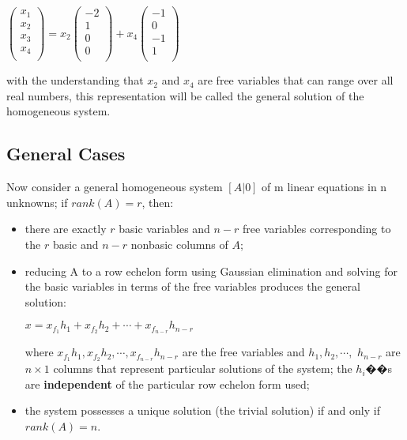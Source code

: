 \documentclass[UTF8,a4paper, 10pt, openany]{book}
\begin{document}
\begin{center}
$\left(
\begin{array}{c}
x_{1} \\ 
x_{2} \\
x_{3} \\
x_{4} \\
\end{array}
\right)=x_{2}
\left(
\begin{array}{c}
-2 \\ 
1 \\
0 \\
0 \\
\end{array}
\right)+x_{4}
\left(
\begin{array}{c}
-1 \\ 
0 \\
-1 \\
1 \\
\end{array}
\right)$
\end{center}
with the understanding that $x_2$ and $x_4$ are free variables that can range over all real numbers, this representation will be called the general solution of the homogeneous system.
\subsection{General Cases}
Now consider a general homogeneous system $[A|0]$ of m linear equations in n unknowns; if $rank(A) = r$, then:
\begin{itemize}
\item there are exactly $r$ basic variables and $n - r$ free variables corresponding to the $r$ basic and $n - r$ nonbasic columns of $A$;
\item reducing A to a row echelon form using Gaussian elimination and
solving for the basic variables in terms of the free variables produces
the general solution:
\begin{center}
$x=x_{f_{1}}h_{1}+x_{f_{2}}h_{2}+\cdots +x_{f_{n-r}}h_{n-r}$
\end{center}
where $x_{f_{1}}h_{1}, x_{f_{2}}h_{2},\cdots , x_{f_{n-r}}h_{n-r}$ are the free variables and $h_{1}, h_{2},\cdots ,$ $h_{n-r}$ are $n\times 1$ columns that represent particular solutions of the system; the $h_i$��s are \textbf{independent} of the particular row echelon form used;
\item the system possesses a unique solution (the trivial solution) if and
only if $rank(A) = n$.
\end{itemize}
\end{document}
